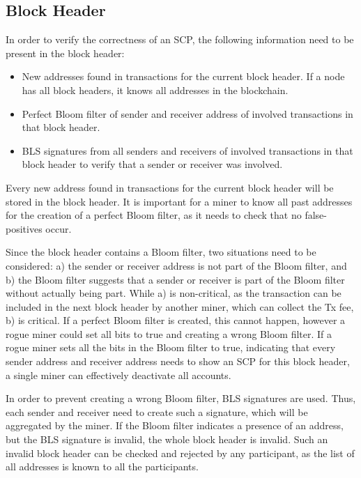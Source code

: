 \documentclass[conference]{IEEEtran}
\begin{document}
\subsection{Block Header} 

In order to verify the correctness of an SCP, the following information need to be present in the block header:
\begin{itemize}
 \item New addresses found in transactions for the current block header. If a node has all block headers, it knows all addresses in the blockchain.
 \item Perfect Bloom filter of sender and receiver address of involved transactions in that block header.
 \item BLS signatures from all senders and receivers of involved transactions in that block header to verify that a sender or receiver was involved.
\end{itemize}

Every new address found in transactions for the current block header will be stored in the block header. It is important for a miner to know all past addresses for the creation of a perfect Bloom filter, as it needs to check that no false-positives occur.

Since the block header contains a Bloom filter, two situations need to be considered: a) the sender or receiver address is not part of the Bloom filter, and b) the Bloom filter suggests that a sender or receiver is part of the Bloom filter without actually being part. While a) is non-critical, as the transaction can be included in the next block header by another miner, which can collect the Tx fee, b) is critical. If a perfect Bloom filter is created, this cannot happen, however a rogue miner could set all bits to true and creating a wrong Bloom filter. If a rogue miner sets all the bits in the Bloom filter to true, indicating that every sender address and receiver address needs to show an SCP for this block header, a single miner can effectively deactivate all accounts.

In order to prevent creating a wrong Bloom filter, BLS signatures are used. Thus, each sender and receiver need to create such a signature, which will be aggregated by the miner. If the Bloom filter indicates a presence of an address, but the BLS signature is invalid, the whole block header is invalid. Such an invalid block header can be checked and rejected by any participant, as the list of all addresses is known to all the participants.
\end{document}
